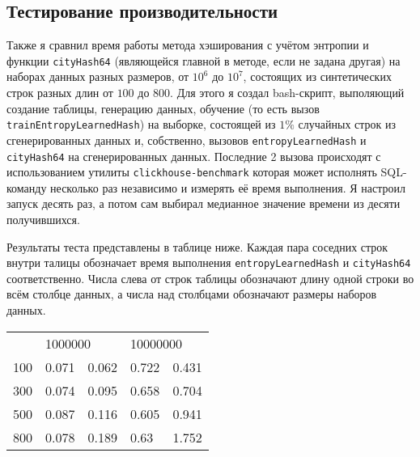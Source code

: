 \documentclass[a4paper,12pt]{extarticle}
\begin{document}
\begin{sloppypar}
\subsection{Тестирование производительности}

Также я сравнил время работы метода хэширования с учётом энтропии и функции \texttt{cityHash64} (являющейся главной в методе, если не задана другая) на наборах данных разных размеров, от $10^6$ до $10^7$, состоящих из синтетических строк разных длин от $100$ до $800$. Для этого я создал bash-скрипт, выполяющий создание таблицы, генерацию данных, обучение (то есть вызов \texttt{trainEntropyLearnedHash}) на выборке, состоящей из $1\%$ случайных строк из сгенерированных данных и, собственно, вызовов \texttt{entropyLearnedHash} и \texttt{cityHash64} на сгенерированных данных. Последние 2 вызова происходят с использованием утилиты \texttt{clickhouse-benchmark} которая может исполнять SQL-команду несколько раз независимо и измерять её время выполнения. Я настроил запуск десять раз, а потом сам выбирал медианное значение времени из десяти получившихся.

Результаты теста представлены в таблице ниже. Каждая пара соседних строк внутри талицы обозначает время выполнения \texttt{entropyLearnedHash} и \texttt{cityHash64} соответственно. Числа слева от строк таблицы обозначают длину одной строки во всём столбце данных, а числа над столбцами обозначают размеры наборов данных.

\begin{table}[]
\begin{tabular}{lllll}
	& \multicolumn{2}{l}{1000000} & \multicolumn{2}{l}{10000000} \\ \cline{2-5} 
\multicolumn{1}{l|}{100} & \multicolumn{1}{l|}{0.071} & \multicolumn{1}{l|}{0.062} & \multicolumn{1}{l|}{0.722} & \multicolumn{1}{l|}{0.431} \\ \cline{2-5} 
\multicolumn{1}{l|}{300} & \multicolumn{1}{l|}{0.074} & \multicolumn{1}{l|}{0.095} & \multicolumn{1}{l|}{0.658} & \multicolumn{1}{l|}{0.704} \\ \cline{2-5} 
\multicolumn{1}{l|}{500} & \multicolumn{1}{l|}{0.087} & \multicolumn{1}{l|}{0.116} & \multicolumn{1}{l|}{0.605} & \multicolumn{1}{l|}{0.941} \\ \cline{2-5} 
\multicolumn{1}{l|}{800} & \multicolumn{1}{l|}{0.078} & \multicolumn{1}{l|}{0.189} & \multicolumn{1}{l|}{0.63} & \multicolumn{1}{l|}{1.752} \\ \cline{2-5} 
\end{tabular}
\end{table}


\end{sloppypar}
\end{document}
